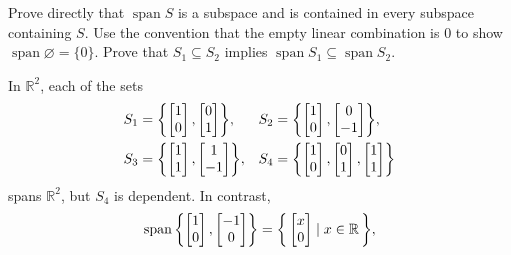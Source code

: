 \begin{Exercise}
Prove directly that $\operatorname{span}S$ is a subspace and is contained in every subspace containing $S$. Use the convention that the empty linear combination is $0$ to show $\operatorname{span}\varnothing=\{0\}$. Prove that $S_1\subseteq S_2$ implies $\operatorname{span}S_1\subseteq\operatorname{span}S_2$.
\end{Exercise}

\begin{Example}
In $\mathbb R^2$, each of the sets
\begin{align*}
S_1&=\qty{\begin{bmatrix}1\\0\end{bmatrix},\begin{bmatrix}0\\1\end{bmatrix}},&
S_2&=\qty{\begin{bmatrix}1\\0\end{bmatrix},\begin{bmatrix}0\\-1\end{bmatrix}},\\
S_3&=\qty{\begin{bmatrix}1\\1\end{bmatrix},\begin{bmatrix}1\\-1\end{bmatrix}},&
S_4&=\qty{\begin{bmatrix}1\\0\end{bmatrix},\begin{bmatrix}0\\1\end{bmatrix},\begin{bmatrix}1\\1\end{bmatrix}}
\end{align*}
spans $\mathbb R^2$, but $S_4$ is dependent. In contrast,
\begin{align*}
\operatorname{span}\qty{\begin{bmatrix}1\\0\end{bmatrix},\begin{bmatrix}-1\\0\end{bmatrix}}&=\qty{\, \begin{bmatrix}x\\0\end{bmatrix} \mid x\in\mathbb R \,},\\

\end{align*}
\end{Example}
